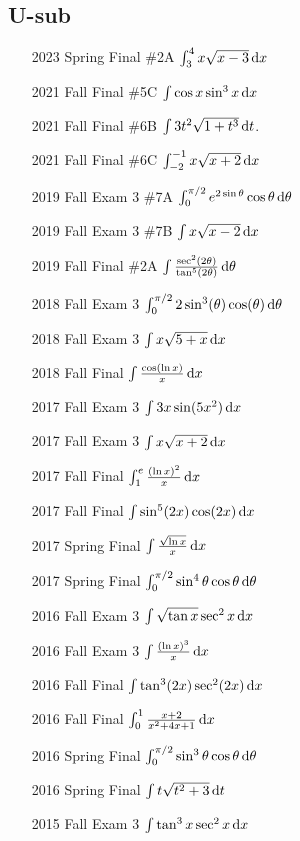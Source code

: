 \documentclass[10pt]{scrartcl}
\theoremstyle{definition}
\begin{document}
\subsection{U-sub}
\begin{enumerate}
\item[2023 Spring Final \#2A] $\int_3^4 x\sqrt{x-3} \dif x$
\item[2021 Fall Final \#5C] $\int \cos x \sin^3 x \dif x$
\item[2021 Fall Final \#6B] $\int 3t^2 \sqrt{1+t^3} \dif t$.
\item[2021 Fall Final \#6C] $\int_{-2}^{-1} x\sqrt{x+2} \dif x$
\item[2019 Fall Exam 3 \#7A] $\int_0^{\pi/2} e^{2\sin \theta} \cos\theta\dif\theta$
\item[2019 Fall Exam 3 \#7B] $\int x\sqrt{x-2}\dif x$
\item[2019 Fall Final \#2A] $\int \frac{\sec[2](2\theta)}{\tan[5](2\theta)} \dif \theta$
\item[2018 Fall Exam 3] $\int_0^{\pi/2} 2\sin^3(\theta) \cos(\theta) \dif \theta$
\item[2018 Fall Exam 3] $\int x \sqrt{5+x} \dif x$
\item[2018 Fall Final] $\int \frac{\cos(\ln x)}{x} \dif x$
\item[2017 Fall Exam 3] $\int 3x \sine(5x^2) \dif x$
\item[2017 Fall Exam 3] $\int x \sqrt{x+2} \dif x$
\item[2017 Fall Final] $\int_1^e \frac{(\ln x)^2}{x} \dif x$
\item[2017 Fall Final] $\int \sin^5(2x) \cos(2x) \dif x$
\item[2017 Spring Final] $\int \frac{\sqrt{\ln x}}{x} \dif x$
\item[2017 Spring Final] $\int_0^{\pi/2} \sin^4 \theta \cos \theta \dif \theta$
\item[2016 Fall Exam 3] $\int \sqrt{\tan x}\sec^2 x \dif x$
\item[2016 Fall Exam 3] $\int \frac{(\ln x)^3}{x} \dif x$
\item[2016 Fall Final] $\int \tan^3(2x) \sec^2(2x) \dif x$
\item[2016 Fall Final] $\int_0^1 \frac{x+2}{x^2+4x+1} \dif x$
\item[2016 Spring Final] $\int_0^{\pi/2} \sin^3 \theta \cos \theta \dif \theta$
\item[2016 Spring Final] $\int t \sqrt{t^2 + 3} \dif t$
\item[2015 Fall Exam 3] $\int \tan^3 x \sec^2 x \dif x$
\end{enumerate}
\end{document}
